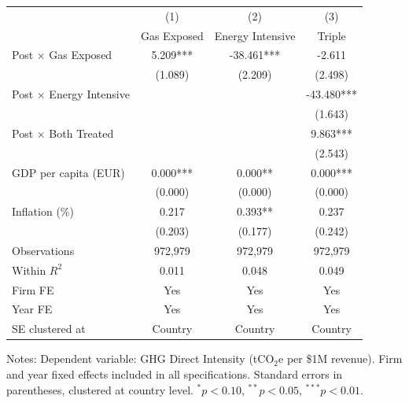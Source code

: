 \begin{threeparttable}
\begin{tabular}{lccc}
\toprule
 & (1) & (2) & (3) \\
 & Gas Exposed & Energy Intensive & Triple \\
\midrule
Post $\times$ Gas Exposed & 5.209*** & -38.461*** & -2.611 \\
 & (1.089) & (2.209) & (2.498) \\[2pt]
Post $\times$ Energy Intensive &  &  & -43.480*** \\
 &  &  & (1.643) \\[2pt]
Post $\times$ Both Treated &  &  & 9.863*** \\
 &  &  & (2.543) \\[2pt]
GDP per capita (EUR) & 0.000*** & 0.000** & 0.000*** \\
 & (0.000) & (0.000) & (0.000) \\[2pt]
Inflation (\%) & 0.217 & 0.393** & 0.237 \\
 & (0.203) & (0.177) & (0.242) \\[2pt]
\midrule
Observations & 972,979 & 972,979 & 972,979 \\
Within $R^2$ & 0.011 & 0.048 & 0.049 \\
Firm FE & Yes & Yes & Yes \\
Year FE & Yes & Yes & Yes \\
SE clustered at & Country & Country & Country \\
\bottomrule
\end{tabular}
\begin{tablenotes}\small
\item Notes: Dependent variable: GHG Direct Intensity (tCO$_2$e per \$1M revenue).
Firm and year fixed effects included in all specifications.
Standard errors in parentheses, clustered at country level.
$^{*}p<0.10$, $^{**}p<0.05$, $^{***}p<0.01$.
\end{tablenotes}
\end{threeparttable}